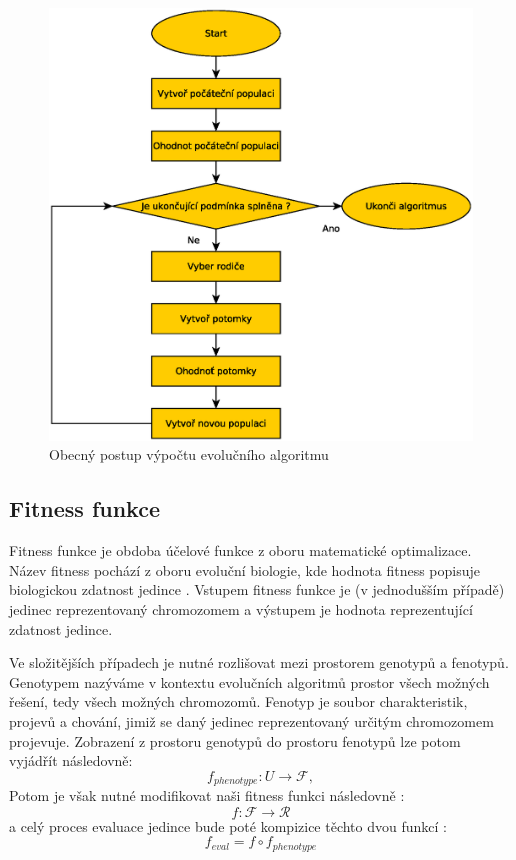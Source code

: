 \begin{figure}[!ht]
	\centering
	\includegraphics[scale=0.4]{fig/evolution_algorithm_flowchart}	
	\caption{Obecný postup výpočtu evolučního algoritmu}
	\label{fig:eaflow}
\end{figure}

\subsection{Fitness funkce}
Fitness funkce je obdoba účelové funkce z oboru matematické optimalizace. Název fitness
pochází z oboru evoluční biologie, kde hodnota fitness popisuje biologickou zdatnost jedince
\cite{evolution_hardware}. Vstupem fitness funkce je (v jednodušším případě) jedinec
reprezentovaný chromozomem a výstupem je hodnota reprezentující zdatnost jedince.

Ve složitějších případech je nutné rozlišovat mezi prostorem genotypů a fenotypů. Genotypem
nazýváme v kontextu evolučních algoritmů prostor všech možných řešení, tedy 
všech možných chromozomů. Fenotyp je soubor charakteristik, projevů a chování,
jimiž se daný jedinec reprezentovaný určitým chromozomem projevuje.
Zobrazení z prostoru genotypů do prostoru fenotypů lze potom vyjádřít následovně:
$$ f_{phenotype} : U \to \mathcal{F}, $$
Potom je však nutné modifikovat naši fitness funkci následovně :
$$ f : \mathcal{F} \to \mathcal{R} $$
a celý proces evaluace jedince bude poté kompizice těchto dvou funkcí :
$$ f_{eval} = f \circ f_{phenotype}$$

